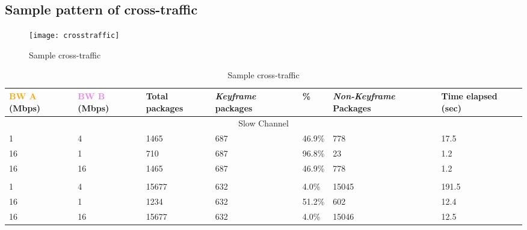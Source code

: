 \subsection{Sample pattern of cross-traffic}

\begin{figure}[!ht]
\caption{Sample cross-traffic}
\centering
\texttt{[image: crosstraffic]}
\end{figure}

\begin{table}[htbp]
\caption{Sample cross-traffic}
\break
\setlength{\arrayrulewidth}{1mm}
\setlength{\tabcolsep}{12pt}
\renewcommand{\arraystretch}{1.5}
 {
\begin{tabular}{ |p{1.375cm}|p{1.375cm}|p{1.5cm}|p{1.5cm}|p{1cm}|p{1.75cm}|p{1.75cm}| }
\hline
\textcolor{orange}{BW A} (Mbps)&\textcolor{violet}{BW B} (Mbps)& Total packages & \textit{Keyframe} packages & \% & \textit{Non-Keyframe} Packages & Time elapsed (sec) \\
\hline
\multicolumn{7}{|c|}{Slow Channel} \\
\hline
1&4&1465&687&46.9\%&778&17.5\\
16&1&710&687&96.8\%&23&1.2\\
16&16&1465&687&46.9\%&778&1.2\\
\hline
\rowcolor{white}\multicolumn{7}{|c|}{Medium Channel} \\
\hline
1&4&15677&632&4.0\%&15045&191.5\\
16&1&1234&632&51.2\%&602&12.4\\
16&16&15677&632&4.0\%&15046&12.5\\
\hline
\end{tabular}
}
\end{table}